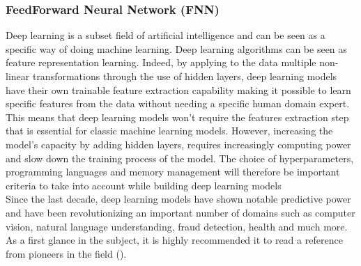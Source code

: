 \documentclass[letter,8pt]{article}\usepackage[]{graphicx}\usepackage[]{color}
\begin{document}
\subsubsection{FeedForward Neural Network (FNN)}

Deep learning is a subset field of artificial intelligence and can be seen as a specific way of doing machine learning. Deep learning algorithms can be seen as feature representation learning. Indeed, by applying to the data multiple non-linear transformations through the use of hidden layers, deep learning models have their own trainable feature extraction capability making it possible to learn specific features from the data without needing a specific human domain expert. This means that deep learning models won't require the features extraction step that is essential for classic machine learning models. However, increasing the model’s capacity by adding hidden layers, requires increasingly computing power and slow down the training process of the model. The choice of hyperparameters, programming languages and memory management will therefore be important criteria to take into account while building deep learning models\\
Since the last decade, deep learning models have shown notable predictive power and have been revolutionizing an important number of domains such as computer vision, natural language understanding, fraud detection, health and much more.\\
As a first glance in the subject, it is highly recommended it to read  a reference from pioneers in the field (\cite[Chapter 1]{Goodfellow-et-al-2016}).
\end{document}
